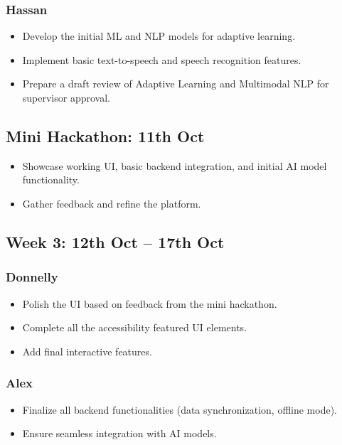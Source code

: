 \documentclass{article}
\begin{document}
\subsubsection{Hassan}
\begin{itemize}
    \item Develop the initial ML and NLP models for adaptive learning.
    \item Implement basic text-to-speech and speech recognition features.
    \item Prepare a draft review of Adaptive Learning and Multimodal NLP for supervisor approval.
\end{itemize}

\subsection{Mini Hackathon: 11th Oct}
\begin{itemize}
    \item Showcase working UI, basic backend integration, and initial AI model functionality.
    \item Gather feedback and refine the platform.
\end{itemize}

\subsection{Week 3: 12th Oct – 17th Oct}
\subsubsection{Donnelly}
\begin{itemize}
    \item Polish the UI based on feedback from the mini hackathon.
    \item Complete all the accessibility featured UI elements.
    \item Add final interactive features.
\end{itemize}

\subsubsection{Alex}
\begin{itemize}
    \item Finalize all backend functionalities (data synchronization, offline mode).
    \item Ensure seamless integration with AI models.
\end{itemize}
\end{document}
